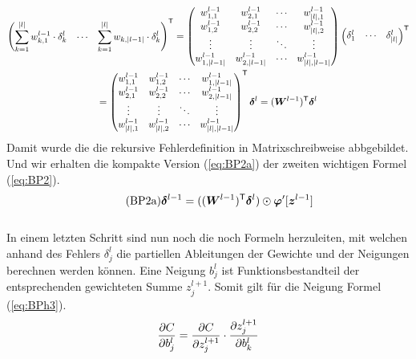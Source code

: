 \begin{appendices}
\begin{gather*}
  \begin{pmatrix} \displaystyle\sum_{k=1}^{|l|} w_{k,1}^{l-1} \cdot \delta_k^l & \cdots & \displaystyle\sum_{k=1}^{|l|} w_{k,|l-1|} \cdot \delta_k^l \end{pmatrix}^{\mathsf{T}} =
  \begin{pmatrix}
    w_{1,1}^{l-1} & w_{2,1}^{l-1} & \cdots & w_{|l|,1}^{l-1} \\
    w_{1,2}^{l-1} & w_{2,2}^{l-1} & \cdots & w_{|l|,2}^{l-1} \\
    \vdots & \vdots & \ddots & \vdots \\
    w_{1,|l-1|}^{l-1} & w_{2,|l-1|}^{l-1} & \cdots & w_{|l|,|l-1|}^{l-1}
  \end{pmatrix}
  \begin{pmatrix} \delta_1^l & \cdots & \delta_{|l|}^l \end{pmatrix}^{\mathsf{T}} \\=
  \begin{pmatrix}
      w_{1,1}^{l-1} & w_{1,2}^{l-1} & \cdots & w_{1,|l-1|}^{l-1} \\
      w_{2,1}^{l-1} & w_{2,2}^{l-1} & \cdots & w_{2,|l-1|}^{l-1} \\
      \vdots & \vdots & \ddots & \vdots \\
      w_{|l|,1}^{l-1} & w_{|l|,2}^{l-1} & \cdots & w_{|l|,|l-1|}^{l-1}
    \end{pmatrix}^{\mathsf{T}}
  \bm{\delta}^l = (\bm{W}^{l-1})^{\mathsf{T}} \bm{\delta}^l
\end{gather*}
\para{}
Damit wurde die die rekursive Fehlerdefinition in Matrixschreibweise
abbgebildet. Und wir erhalten die kompakte Version (\ref{eq:BP2a}) der zweiten wichtigen Formel (\ref{eq:BP2}).
\\
\begin{equation}\tag{BP2a}\label{eq:BP2a}
  \bm{\delta}^{l-1} = ((\bm{W}^{l-1})^{\mathsf{T}} \bm{\delta}^l) \odot \bm{\varphi}'[\bm{z}^{l-1}]
\end{equation}
\\
In einem letzten Schritt sind nun noch die noch Formeln herzuleiten, mit welchen
anhand des Fehlers $\delta_j^l$ die partiellen Ableitungen der Gewichte und
der Neigungen berechnen werden können.
\para{}
Eine Neigung $b_j^l$ ist Funktionsbestandteil der entsprechenden gewichteten
Summe $z_j^{l+1}$. Somit gilt für die Neigung Formel (\ref{eq:BPh3}).
\\
\begin{equation}\label{eq:BPh3}
  \partderiv{C}{b_j^l} = \partderiv{C}{z_j^{l+1}} \cdot \partderiv{z_j^{l+1}}{b_k^l}

\end{equation}
\end{appendices}
